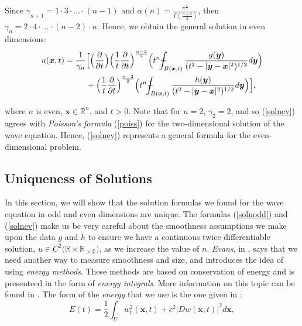 \documentclass[a4paper, 12pt]{article}
\def\Xint#1{\mathchoice
{\XXint\displaystyle\textstyle{#1}}%
{\XXint\textstyle\scriptstyle{#1}}%
{\XXint\scriptstyle\scriptscriptstyle{#1}}%
{\XXint\scriptscriptstyle\scriptscriptstyle{#1}}%
\!\int}
\def\XXint#1#2#3{{\setbox0=\hbox{$#1{#2#3}{\int}$ }
\vcenter{\hbox{$#2#3$ }}\kern-.6\wd0}}
\def\dashint{\Xint-}
\numberwithin{equation}{section}
\begin{document}
Since $\gamma_{n+1}=1 \cdot 3 \cdot ... \cdot (n-1)$ and
$\alpha(n)=\frac{\pi^{\frac{n}{2}}}{\Gamma(\frac{n+2}{2})}$, then $\gamma_n=2
\cdot 4 \cdot ... \cdot(n-2) \cdot n$. Hence, we obtain the general solution in
even dimensions:
\begin{equation} \label{solnev}
    \begin{split}
        u(\boldsymbol{x}, t)= \frac{1}{\gamma_n} &\Big[ \Big(\diffp[1]{}{t}\Big) \Big(\frac{1}{t} \diffp[1]{}{t}\Big)^{\frac{n-2}{2}}\Big(t^n \dashint_{B(\boldsymbol{x}, t)} \frac{g(\boldsymbol{y})}{(t^2-|\boldsymbol{y}-\boldsymbol{x}|^2)^{1/2}} d \boldsymbol{y} \Big)\\
        & +\Big(\frac{1}{t} \diffp[1]{}{t}\Big)^{\frac{n-2}{2}}\Big(t^n \dashint_{B(\boldsymbol{x},t)} \frac{h(\boldsymbol{y})}{(t^2-|\boldsymbol{y}-\boldsymbol{x}|^2)^{1/2}} d \boldsymbol{y} \Big) \Big],
    \end{split}
\end{equation}

where $n$ is even, $\boldsymbol{x}\in \mathbb{R}^n$, and $t>0$. Note that for
$n=2$, $\gamma_2 = 2$, and so (\ref{solnev}) agrees with \emph{Poisson's formula}
(\ref{poiss}) for the two-dimensional solution of the wave equation. Hence,
(\ref{solnev}) represents a general formula for the even-dimensional problem.


\subsection{Uniqueness of Solutions} \label{uniqueness}
In this section, we will show that the solution formulas we found for the wave
equation in odd and even dimensions are unique. The formulas (\ref{solnodd}) and
(\ref{solnev}) make us be very careful about the smoothness assumptions we make
upon the data $g$ and $h$ to ensure we have a continuous twice differentiable
solution, $u \in C^2(\mathbb{R} \times \mathbb{R_{>0})}$, as we increase the
value of $n$. \emph{Evans}, in \cite[Ch. 2.4.3.a]{Ev}, says that we need another
way to measure smoothness and size, and introduces the idea of using
\emph{energy methods}. These methods are based on conservation of energy and
is presenteed in the form of \emph{energy integrals}. More information on
this topic can be found in \cite[Chapter VI, Section 6]{Hil}. The form of the
\emph{energy} that we use is the one given in \cite[Ch. 2.4.3.a, Th. 5]{Ev}:
\begin{equation} \label{energy}
    E(t)=\frac{1}{2}\int_U w_t^2(\boldsymbol{x}, t)+c^2|Dw(\boldsymbol{x}, t)|^2d\boldsymbol{x},
\end{equation}
\end{document}
